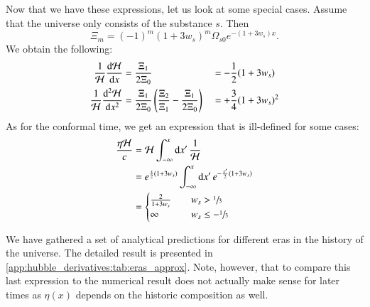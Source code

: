 Now that we have these expressions, let us look at some special cases. Assume that the universe only consists of the substance $s$. Then
\begin{equation}
    \Xi_m = (-1)^m(1+3w_s)^m \Omega_{s0}e^{-(1+3w_s)x}.
\end{equation}
We obtain the following:
\begin{subequations}
    \begin{align}
        \frac{1}{\mathcal{H}} \frac{\mathrm{d} \mathcal{H}}{\mathrm{d} x} &= \frac{\Xi_1}{2\Xi_0} &&= - \frac{1}{2}(1+3w_s) \\
        \frac{1}{\mathcal{H}} \frac{\mathrm{d}^2 \mathcal{H}}{\mathrm{d} x^2} &= \frac{\Xi_1}{2\Xi_0} \left( \frac{\Xi_2}{\Xi_1}- \frac{\Xi_1}{2\Xi_0}  \right) &&=+ \frac{3}{4}(1+3w_s)^2
    \end{align}
\end{subequations}
As for the conformal time, we get an expression that is ill-defined for some cases:
\begin{equation}
    \begin{split}
        \frac{\eta \mathcal{H}}{c} &= \mathcal{H} \int_{-\infty}^{x} \mathrm{d} x'\, \frac{1}{\mathcal{H}} \\
            &= e^{\frac{x}{2}(1+3w_s)} \int_{-\infty}^{x} \mathrm{d} x' \,e^{-\frac{x'}{2}(1+3w_s)} \\
            &= \begin{cases}
                \frac{2}{1+3w_s} \quad& w_s > \sfrac{1}{3} \\
                \infty & w_s \leq -\sfrac{1}{3}
            \end{cases}
    \end{split}
\end{equation}

We have gathered a set of analytical predictions for different eras in the history of the universe. The detailed result is presented in \cref{app:hubble_derivatives:tab:eras_approx}. Note, however, that to compare this last expression to the numerical result does not actually make sense for later times as $\eta(x)$ depends on the historic composition as well.

